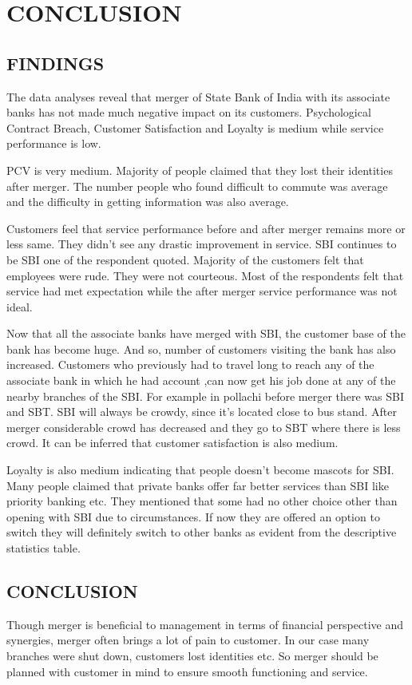 \documentclass[a4paper, 14pt]{article}
\begin{document}
{%
\newpage
\section{CONCLUSION}
\subsection{FINDINGS}
The data analyses reveal that merger of State Bank of India with its associate banks has not made much negative impact on its customers. Psychological Contract Breach, Customer Satisfaction and Loyalty is medium while service performance is low.

PCV is very medium. Majority of people claimed that they lost their identities after merger. The number people who found difficult to commute was average and the difficulty in getting information was also average.

Customers feel that service performance before and after merger remains more or less same. They didn't see any drastic improvement in service. SBI continues to be SBI one of the respondent quoted. Majority of the customers felt that employees were rude. They were not courteous. Most of the respondents felt that service had met expectation while the after merger service performance was not ideal.

Now that all the associate banks have merged with SBI, the customer base of the bank has become huge. And so, number of customers visiting the bank has also increased. Customers who previously had to travel long to reach any of the associate bank in which he had account ,can now get his job done at any of the nearby branches of the SBI. For example in pollachi before merger there was SBI and SBT. SBI will always be crowdy, since it's located close to bus stand. After merger considerable crowd has decreased and they go to SBT where there is less crowd. It can be inferred that customer satisfaction is also medium.

Loyalty is also medium indicating that people doesn't become mascots for SBI. Many people claimed that private banks offer far better services than SBI like priority banking etc. They mentioned that some had no other choice other than opening with SBI due to circumstances. If now they are offered an option to switch they will definitely switch to other banks as evident from the descriptive statistics table.

\subsection{CONCLUSION}
Though merger is beneficial to management in terms of financial perspective and synergies, merger often brings a lot of pain to customer. In our case many branches were shut down, customers lost identities etc. So merger should be planned with customer in mind to ensure smooth functioning and service.

}
\end{document}
